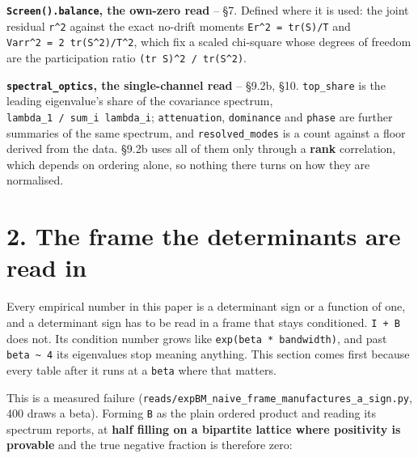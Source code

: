 \documentclass[10pt,letterpaper,twocolumn]{article}
\begin{document}
\textbf{\texttt{Screen(\allowbreak{})\allowbreak{}.\allowbreak{}balance}, the own-zero read} -- §7. Defined where it is used: the joint residual
\texttt{\textbar{}\allowbreak{}\textbar{}\allowbreak{}r\textbar{}\allowbreak{}\textbar{}\allowbreak{}\^{}2} against the exact no-drift moments \texttt{E\textbar{}\allowbreak{}\textbar{}\allowbreak{}r\textbar{}\allowbreak{}\textbar{}\allowbreak{}\^{}2\ =\allowbreak{}\ tr(\allowbreak{}S)\allowbreak{}/\allowbreak{}T} and \texttt{Var\textbar{}\allowbreak{}\textbar{}\allowbreak{}r\textbar{}\allowbreak{}\textbar{}\allowbreak{}\^{}2\ =\allowbreak{}\ 2\ tr(\allowbreak{}S\^{}2)\allowbreak{}/\allowbreak{}T\^{}2},
which fix a scaled chi-square whose degrees of freedom are the participation ratio
\texttt{(\allowbreak{}tr\ S)\allowbreak{}\^{}2\ /\allowbreak{}\ tr(\allowbreak{}S\^{}2)\allowbreak{}}.

\textbf{\texttt{spectral\_\allowbreak{}optics}, the single-channel read} -- §9.2b, §10. \texttt{top\_\allowbreak{}share} is the leading
eigenvalue's share of the covariance spectrum, \texttt{lambda\_\allowbreak{}1\ /\allowbreak{}\ sum\_\allowbreak{}i\ lambda\_\allowbreak{}i}; \texttt{attenuation},
\texttt{dominance} and \texttt{phase} are further summaries of the same spectrum, and \texttt{resolved\_\allowbreak{}modes} is a count
against a floor derived from the data. §9.2b uses all of them only through a \textbf{rank} correlation,
which depends on ordering alone, so nothing there turns on how they are normalised.

\section{2. The frame the determinants are read in}\label{2-the-frame-the-determinants-are-read-in}

Every empirical number in this paper is a determinant sign or a function of one, and a
determinant sign has to be read in a frame that stays conditioned. \texttt{I\ +\allowbreak{}\ B} does not. Its condition
number grows like \texttt{exp(\allowbreak{}beta\ *\allowbreak{}\ bandwidth)\allowbreak{}}, and past \texttt{beta\ \textasciitilde{}\ 4} its eigenvalues stop meaning
anything. This section comes first because every table after it runs at a \texttt{beta} where that
matters.

This is a measured failure (\texttt{reads/\allowbreak{}expBM\_\allowbreak{}naive\_\allowbreak{}frame\_\allowbreak{}manufactures\_\allowbreak{}a\_\allowbreak{}sign.\allowbreak{}py}, 400 draws a beta).
Forming \texttt{B} as the plain ordered product and reading its spectrum reports, at \textbf{half filling on a
bipartite lattice where positivity is provable} and the true negative fraction is therefore zero:
\end{document}
